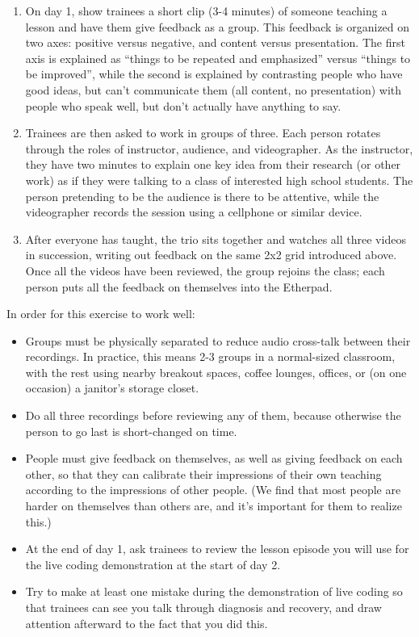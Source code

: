 \begin{enumerate}
\def\labelenumi{\arabic{enumi}.}
\item
  On day 1, show trainees a short clip (3-4 minutes) of someone teaching
  a lesson and have them give feedback as a group. This feedback is
  organized on two axes: positive versus negative, and content versus
  presentation. The first axis is explained as ``things to be repeated
  and emphasized'' versus ``things to be improved'', while the second is
  explained by contrasting people who have good ideas, but can't
  communicate them (all content, no presentation) with people who speak
  well, but don't actually have anything to say.
\item
  Trainees are then asked to work in groups of three. Each person
  rotates through the roles of instructor, audience, and videographer.
  As the instructor, they have two minutes to explain one key idea from
  their research (or other work) as if they were talking to a class of
  interested high school students. The person pretending to be the
  audience is there to be attentive, while the videographer records the
  session using a cellphone or similar device.
\item
  After everyone has taught, the trio sits together and watches all
  three videos in succession, writing out feedback on the same 2x2 grid
  introduced above. Once all the videos have been reviewed, the group
  rejoins the class; each person puts all the feedback on themselves
  into the Etherpad.
\end{enumerate}

In order for this exercise to work well:

\begin{itemize}
\item
  Groups must be physically separated to reduce audio cross-talk between
  their recordings. In practice, this means 2-3 groups in a normal-sized
  classroom, with the rest using nearby breakout spaces, coffee lounges,
  offices, or (on one occasion) a janitor's storage closet.
\item
  Do all three recordings before reviewing any of them, because
  otherwise the person to go last is short-changed on time.
\item
  People must give feedback on themselves, as well as giving feedback on
  each other, so that they can calibrate their impressions of their own
  teaching according to the impressions of other people. (We find that
  most people are harder on themselves than others are, and it's
  important for them to realize this.)
\item
  At the end of day 1, ask trainees to review the lesson episode you
  will use for the live coding demonstration at the start of day 2.
\item
  Try to make at least one mistake during the demonstration of live
  coding so that trainees can see you talk through diagnosis and
  recovery, and draw attention afterward to the fact that you did this.
\end{itemize}


